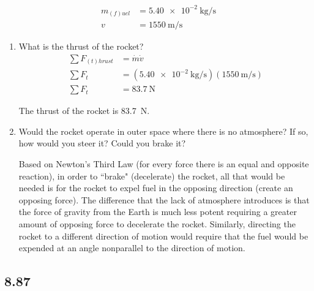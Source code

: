 \documentclass{article}
\begin{document}
\begin{align*}
	m_{(f)uel} & = \SI{5.40e-2}{\kilogram \per \second} \\
	v & = \SI{1550}{\meter \per \second}
\end{align*}
\begin{enumerate}[label = \textbf{(\alph*)}]
	\item What is the thrust of the rocket?
		\begin{align*}
			\sum F_{(t)hrust} & = \dot{m}\dot{v} \\
			\sum F_t & = (\SI{5.40e-2}{\kilogram \per \second})(\SI{1550}{\meter \per \second}) \\
			\sum F_t & = \SI{83.7}{\newton}
		\end{align*}
		\begin{mdframed}
			The thrust of the rocket is \SI{83.7}{\newton}.
		\end{mdframed}
	\item Would the rocket operate in outer space where there is no atmosphere? If so, how would you steer it? Could you brake it?
		\begin{mdframed}
			Based on Newton's Third Law (for every force there is an equal and opposite reaction), in order to ``brake" (decelerate) the rocket, all that would be needed is for the rocket to expel fuel in the opposing direction (create an opposing force). The difference that the lack of atmosphere introduces is that the force of gravity from the Earth is much less potent requiring a greater amount of opposing force to decelerate the rocket. Similarly, directing the rocket to a different direction of motion would require that the fuel would be expended at an angle nonparallel to the direction of motion.
		\end{mdframed}
\end{enumerate}

\subsection{8.87}
\end{document}
